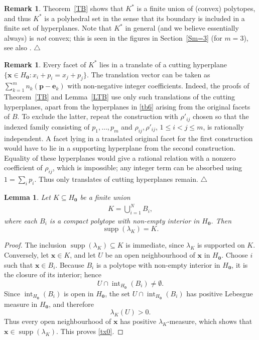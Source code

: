 \documentclass[11pt,reqno,tbtags,a4paper]{amsart}
\numberwithin{equation}{section}
\renewcommand\le{\leq}
\renewcommand\leq{\leqslant}
\theoremstyle{plain}%
\newtheorem{lemma}[theorem]{Lemma}
\theoremstyle{definition}
\newcommand\xqed[1]{%
    \leavevmode\unskip\penalty9999 \hbox{}\nobreak\hfill
    \quad\hbox{#1}}
\newtheorem{remarkqqq}[theorem]{Remark}
\newenvironment{remark}{\begin{remarkqqq}}
  {\xqed{$\triangle$}\end{remarkqqq}}
\theoremstyle{remark}
\newcommand{\refT}[1]{Theorem~\ref{#1}}
\newcommand{\refL}[1]{Lemma~\ref{#1}}
\newcommand{\refS}[1]{Section~\ref{#1}}
\newcommand\set[1]{\ensuremath{\{#1\}}}
\newcommand\supp{\operatorname{supp}}
\newcommand\gl{\lambda}
\newcommand\Ho{H_{\0}}
\newcommand\ve{\mathbf{e}}
\newcommand\vp{\mathbf{p}}
\newcommand\vx{\mathbf{x}}
\newcommand\Kx{K^*}
\newcommand\0{{\boldsymbol 0}}
\newcommand\1{{\boldsymbol 1}}
\begin{document}
\begin{remark}
  \refT{TB} shows that $\Kx$ is a finite union of (convex) polytopes, and
  thus $\Kx$ is a polyhedral set in the sense that its boundary is included in
  a finite set of hyperplanes. Note that $\Kx$ in general (and we believe
  essentially always) is \emph{not} convex; this is seen in the figures in
  \refS{Sm=3} (for $m=3$), see also \cite{adler10,adler17}. 
\end{remark}

\begin{remark}\label{Rapr27}
  Every facet of $\Kx$ lies in a translate of a cutting hyperplane
$\set{\vx\in\Ho:x_i+p_i=x_j+p_j}$.
The translation vector can be taken as
$\sum_{k=1}^m n_k(\vp-\ve_k)$ with non-negative integer coefficients.
Indeed, the proofs of \refT{TB} and \refL{LTB} use only such translations
of the cutting hyperplanes, apart from the hyperplanes in \eqref{tb6}
arising from the original facets of $B$.
To exclude the latter, repeat the construction with $\rho'_{ij}$ chosen
so that the indexed family consisting of $p_1,\dots,p_m$ and
$\rho_{ij},\rho'_{ij}$, $1\le i<j\le m$, is rationally independent.
A facet lying in a translated original facet for the first construction
would have to lie in a supporting hyperplane from the second construction.
Equality of these hyperplanes would give a rational relation with a
nonzero coefficient of $\rho_{ij}$, which is impossible; any integer term
can be absorbed using $1=\sum_i p_i$. Thus only translates of cutting
hyperplanes remain.
\end{remark}

\begin{lemma}\label{Lpoly-support}
Let $K\subseteq\Ho$ be a finite union
\begin{align}
K=\bigcup_{i=1}^N B_i,  
\end{align}
where each $B_i$ is a compact polytope with non-empty interior in $\Ho$.
Then
\begin{equation}\label{tx0}
\supp(\gl_K)=K.
\end{equation}
\end{lemma}

\begin{proof}
The inclusion $\supp(\gl_K)\subseteq K$ is immediate, since $\gl_K$ is
supported on $K$.
Conversely, let $\vx\in K$, and let $U$ be an open neighbourhood of $\vx$
in $\Ho$. Choose $i$ such that $\vx\in B_i$.
Because $B_i$ is a polytope with non-empty interior in $\Ho$, it is the
closure of its interior; hence
\begin{equation}
U\cap \operatorname{int}_{\Ho}(B_i)\neq\emptyset.
\end{equation}
Since $\operatorname{int}_{\Ho}(B_i)$ is open in $\Ho$, the set
$U\cap \operatorname{int}_{\Ho}(B_i)$ has positive Lebesgue measure in
$\Ho$, and therefore
\begin{equation}
\gl_K(U)>0.
\end{equation}
Thus every open neighbourhood of $\vx$ has positive $\gl_K$-measure, which
shows that $\vx\in\supp(\gl_K)$. This proves \eqref{tx0}.
\end{proof}
\end{document}
